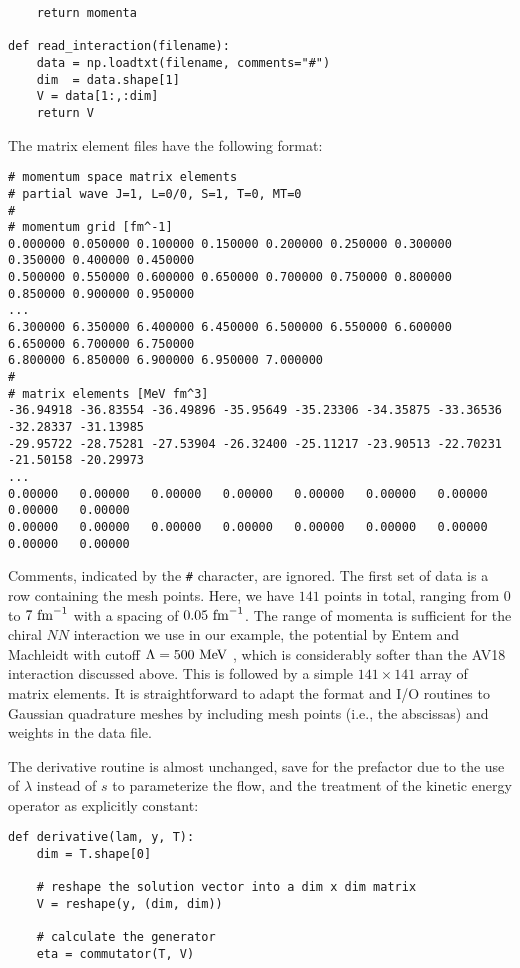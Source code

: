 {\begin{lstlisting}
    return momenta
  
def read_interaction(filename):
    data = np.loadtxt(filename, comments="#")  
    dim  = data.shape[1]
    V = data[1:,:dim]
    return V
\end{lstlisting}

The matrix element files have the following format:
\begin{lstlisting}
# momentum space matrix elements 
# partial wave J=1, L=0/0, S=1, T=0, MT=0 
# 
# momentum grid [fm^-1]
0.000000 0.050000 0.100000 0.150000 0.200000 0.250000 0.300000 0.350000 0.400000 0.450000 
0.500000 0.550000 0.600000 0.650000 0.700000 0.750000 0.800000 0.850000 0.900000 0.950000 
...
6.300000 6.350000 6.400000 6.450000 6.500000 6.550000 6.600000 6.650000 6.700000 6.750000 
6.800000 6.850000 6.900000 6.950000 7.000000 
#
# matrix elements [MeV fm^3] 
-36.94918 -36.83554 -36.49896 -35.95649 -35.23306 -34.35875 -33.36536 -32.28337 -31.13985 
-29.95722 -28.75281 -27.53904 -26.32400 -25.11217 -23.90513 -22.70231 -21.50158 -20.29973 
...
0.00000   0.00000   0.00000   0.00000   0.00000   0.00000   0.00000   0.00000   0.00000   
0.00000   0.00000   0.00000   0.00000   0.00000   0.00000   0.00000   0.00000   0.00000
\end{lstlisting}
Comments, indicated by the \texttt{\#} character, are ignored. The first set
of data is a row containing the mesh points. Here, we have $141$ points in total,
ranging from $0$ to $7\,\,\text{fm}^{-1}$ with a spacing of $0.05\,\,\text{fm}^{-1}$. The range of momenta
is sufficient for the chiral $NN$ interaction we use in our example, the \NNNLO{} 
potential by Entem and Machleidt with cutoff $\Lambda=500\,\,\text{MeV}$ \cite{Entem:2003th,Machleidt:2011bh}, 
which is considerably softer than the AV18 interaction discussed above. This is followed
by a simple $141 \times 141$ array of matrix elements. It is straightforward
to adapt the format and I/O routines to Gaussian quadrature meshes by including
mesh points (i.e., the abscissas) and weights in the data file.

The derivative routine is almost unchanged, save for the prefactor due to the
use of $\lambda$ instead of $s$ to parameterize the flow, and the treatment of
the kinetic energy operator as explicitly constant:
\begin{lstlisting}
def derivative(lam, y, T):
    dim = T.shape[0]

    # reshape the solution vector into a dim x dim matrix
    V = reshape(y, (dim, dim))

    # calculate the generator
    eta = commutator(T, V)


\end{lstlisting}}
